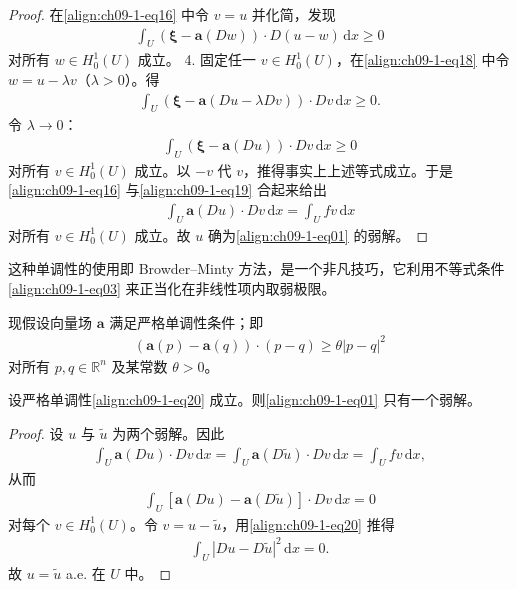 \documentclass[../../main.tex]{subfiles}
\begin{document}
\begin{theorem}[弱解的存在性]
\begin{proof}
在\eqref{align:ch09-1-eq16} 中令 $v=u$ 并化简，发现
\begin{align}
\int_U(\boldsymbol{\xi}-\mathbf{a}(Dw))\cdot D(u-w)\,\mathrm{d}x\geqslant 0\label{align:ch09-1-eq18}
\end{align}
对所有 $w\in H_0^1(U)$ 成立。
4. 固定任一 $v\in H_0^1(U)$，在\eqref{align:ch09-1-eq18} 中令 $w=u-\lambda v$（$\lambda>0$）。得
\begin{align*}
\int_U(\boldsymbol{\xi}-\mathbf{a}(Du-\lambda Dv))\cdot Dv\,\mathrm{d}x\geqslant 0.
\end{align*}
令 $\lambda\to 0$：
\begin{align}
\int_U(\boldsymbol{\xi}-\mathbf{a}(Du))\cdot Dv\,\mathrm{d}x\geqslant 0\label{align:ch09-1-eq19}
\end{align}
对所有 $v\in H_0^1(U)$ 成立。以 $-v$ 代 $v$，推得事实上上述等式成立。于是\eqref{align:ch09-1-eq16} 与\eqref{align:ch09-1-eq19} 合起来给出
\begin{align*}
\int_U\mathbf{a}(Du)\cdot Dv\,\mathrm{d}x=\int_U fv\,\mathrm{d}x
\end{align*}
对所有 $v\in H_0^1(U)$ 成立。故 $u$ 确为\eqref{align:ch09-1-eq01} 的弱解。
\end{proof}
\end{theorem}

这种单调性的使用即 Browder--Minty 方法，是一个非凡技巧，它利用不等式条件\eqref{align:ch09-1-eq03} 来正当化在非线性项内取弱极限。

现假设向量场 $\mathbf{a}$ 满足严格单调性条件；即
\begin{align}
(\mathbf{a}(p)-\mathbf{a}(q))\cdot(p-q)\geqslant\theta|p-q|^2\label{align:ch09-1-eq20}
\end{align}
对所有 $p,q\in\mathbb{R}^n$ 及某常数 $\theta>0$。

\begin{theorem}[弱解的唯一性]\label{theorem:ch09-1-4-弱解唯一}
设严格单调性\eqref{align:ch09-1-eq20} 成立。则\eqref{align:ch09-1-eq01} 只有一个弱解。
\begin{proof}
设 $u$ 与 $\widetilde{u}$ 为两个弱解。因此
\begin{align*}
\int_U\mathbf{a}(Du)\cdot Dv\,\mathrm{d}x=\int_U\mathbf{a}(D\widetilde{u})\cdot Dv\,\mathrm{d}x=\int_U fv\,\mathrm{d}x,
\end{align*}
从而
\begin{align*}
\int_U[\mathbf{a}(Du)-\mathbf{a}(D\widetilde{u})]\cdot Dv\,\mathrm{d}x=0
\end{align*}
对每个 $v\in H_0^1(U)$。令 $v=u-\widetilde{u}$，用\eqref{align:ch09-1-eq20} 推得
\begin{align*}
\int_U|Du-D\widetilde{u}|^2\,\mathrm{d}x=0.
\end{align*}
故 $u=\widetilde{u}$ a.e. 在 $U$ 中。
\end{proof}
\end{theorem}
\end{document}
